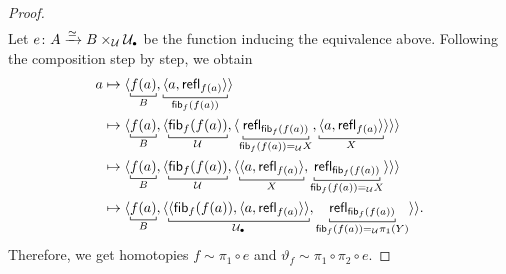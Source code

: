 \begin{proof}
\begin{align*}
    \end{align*}
    Let\/ $e\colon A\xto{\simeq} B\times_\univ\puniv$ be the function inducing the equivalence above. Following the composition step by step, we obtain
    \begin{align*}
        a&\mapsto\dep{
            \explain[B]{f(a)},
            \explain[\fun{fib}_f(f(a))]
            {\dep{a,\fun{refl}_{f(a)}}}
            }\\
        &\mapsto
            \dep{
                \explain[B]{f(a)},
                \dep{
                    \explain[\univ]{\fun{fib}_f(f(a))},
                    \dep{
                        \explain[\fun{fib}_f(f(a))\eq{\univ}X]{
                            \fun{refl}_{\fun{fib}_f(f(a))}
                        },
                        \explain[X]{
                            \dep{
                                a,
                                \fun{refl}_{f(a)}
                            }
                        }
                    }
                }
            }\\
        &\mapsto
            \dep{
                \explain[B]{f(a)},
                \dep{
                    \explain[\univ]{\fun{fib}_f(f(a))},
                    \dep{
                        \explain[X]{\dep{a,\fun{refl}_{f(a)}}}, 
                        \explain[\fun{fib}_f(f(a))\eq{\univ}X]{
                            \fun{refl}_{\fun{fib}_f(f(a))}
                        }
                    }
                }
            }\\
        &\mapsto
            \dep{
                \explain[B]{f(a)},
                \dep{
                    \explain[\puniv]{
                        \dep{
                            \fun{fib}_f(f(a)),
                            \dep{a,\fun{refl}_{f(a)}}
                        }
                    },
                    \explain[\fun{fib}_f(f(a))\eq{\univ}\pi_1(Y)]{
                        \fun{refl}_{\fun{fib}_f(f(a))}
                    }
                }
            }.
    \end{align*}
    Therefore, we get homotopies\/ $f\sim\pi_1\circ e$ and\/ $\vartheta_f\sim\pi_1\circ\pi_2\circ e$.
\end{proof}


